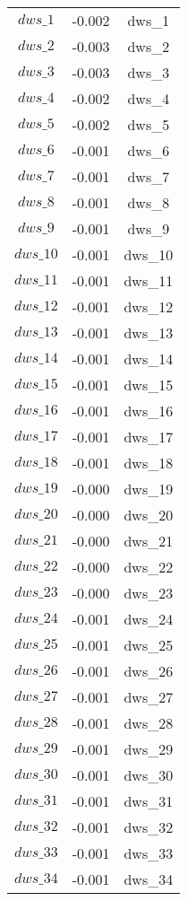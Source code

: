 \begin{center}
\begin{longtable}{ccc}
$dws\_1$ 	 & 	 -0.002 	 & 	 dws\_1\\
$dws\_2$ 	 & 	 -0.003 	 & 	 dws\_2\\
$dws\_3$ 	 & 	 -0.003 	 & 	 dws\_3\\
$dws\_4$ 	 & 	 -0.002 	 & 	 dws\_4\\
$dws\_5$ 	 & 	 -0.002 	 & 	 dws\_5\\
$dws\_6$ 	 & 	 -0.001 	 & 	 dws\_6\\
$dws\_7$ 	 & 	 -0.001 	 & 	 dws\_7\\
$dws\_8$ 	 & 	 -0.001 	 & 	 dws\_8\\
$dws\_9$ 	 & 	 -0.001 	 & 	 dws\_9\\
$dws\_10$ 	 & 	 -0.001 	 & 	 dws\_10\\
$dws\_11$ 	 & 	 -0.001 	 & 	 dws\_11\\
$dws\_12$ 	 & 	 -0.001 	 & 	 dws\_12\\
$dws\_13$ 	 & 	 -0.001 	 & 	 dws\_13\\
$dws\_14$ 	 & 	 -0.001 	 & 	 dws\_14\\
$dws\_15$ 	 & 	 -0.001 	 & 	 dws\_15\\
$dws\_16$ 	 & 	 -0.001 	 & 	 dws\_16\\
$dws\_17$ 	 & 	 -0.001 	 & 	 dws\_17\\
$dws\_18$ 	 & 	 -0.001 	 & 	 dws\_18\\
$dws\_19$ 	 & 	 -0.000 	 & 	 dws\_19\\
$dws\_20$ 	 & 	 -0.000 	 & 	 dws\_20\\
$dws\_21$ 	 & 	 -0.000 	 & 	 dws\_21\\
$dws\_22$ 	 & 	 -0.000 	 & 	 dws\_22\\
$dws\_23$ 	 & 	 -0.000 	 & 	 dws\_23\\
$dws\_24$ 	 & 	 -0.001 	 & 	 dws\_24\\
$dws\_25$ 	 & 	 -0.001 	 & 	 dws\_25\\
$dws\_26$ 	 & 	 -0.001 	 & 	 dws\_26\\
$dws\_27$ 	 & 	 -0.001 	 & 	 dws\_27\\
$dws\_28$ 	 & 	 -0.001 	 & 	 dws\_28\\
$dws\_29$ 	 & 	 -0.001 	 & 	 dws\_29\\
$dws\_30$ 	 & 	 -0.001 	 & 	 dws\_30\\
$dws\_31$ 	 & 	 -0.001 	 & 	 dws\_31\\
$dws\_32$ 	 & 	 -0.001 	 & 	 dws\_32\\
$dws\_33$ 	 & 	 -0.001 	 & 	 dws\_33\\
$dws\_34$ 	 & 	 -0.001 	 & 	 dws\_34\\

\end{longtable}
\end{center}
